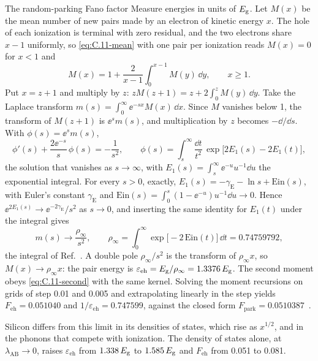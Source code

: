 \begin{workedexample}{The random-parking Fano factor}\label{we:18-parking}
Measure energies in units of $E_{\mathrm{g}}$. Let $M(x)$ be the mean number of new pairs made by an electron of kinetic energy $x$. The hole of each ionization is terminal with zero residual, and the two electrons share $x - 1$ uniformly, so \cref{eq:C.11-mean} with one pair per ionization reads $M(x) = 0$ for $x < 1$ and
\begin{equation*}
  M(x) = 1 + \frac{2}{x - 1}\int_0^{x - 1}M(y)\,\dd y , \qquad x \ge 1 .
\end{equation*}
Put $x = z + 1$ and multiply by $z$: $zM(z + 1) = z + 2\int_0^zM(y)\,\dd y$. Take the Laplace transform $m(s) = \int_0^\infty\ee^{-sx}M(x)\,\dd x$. Since $M$ vanishes below 1, the transform of $M(z + 1)$ is $\ee^sm(s)$, and multiplication by $z$ becomes $-\dd/\dd s$. With $\phi(s) = \ee^sm(s)$,
\begin{equation*}
  \phi'(s) + \frac{2\ee^{-s}}{s}\,\phi(s) = -\frac{1}{s^2} , \qquad
  \phi(s) = \int_s^\infty\frac{\dd t}{t^2}\,\exp\bigl[2E_1(s) - 2E_1(t)\bigr] ,
\end{equation*}
the solution that vanishes as $s \to \infty$, with $E_1(s) = \int_s^\infty\ee^{-u}u^{-1}\dd u$ the exponential integral. For every $s > 0$, exactly, $E_1(s) = -\gamma_{\mathrm{E}} - \ln s + \mathrm{Ein}(s)$, with Euler's constant $\gamma_{\mathrm{E}}$ and $\mathrm{Ein}(s) = \int_0^s(1 - \ee^{-u})u^{-1}\dd u \to 0$. Hence $\ee^{2E_1(s)} \to \ee^{-2\gamma_{\mathrm{E}}}/s^2$ as $s \to 0$, and inserting the same identity for $E_1(t)$ under the integral gives
\begin{equation*}
  m(s) \to \frac{\rho_\infty}{s^2} , \qquad
  \rho_\infty = \int_0^\infty\exp\bigl[-2\,\mathrm{Ein}(t)\bigr]\,\dd t = 0.74759792 ,
\end{equation*}
the integral of Ref.~\cite[Eq.~(23)]{subashiev2010correlation}.
A double pole $\rho_\infty/s^2$ is the transform of $\rho_\infty x$, so $M(x) \to \rho_\infty x$: the pair energy is $\varepsilon_{\mathrm{eh}} = E_{\mathrm{g}}/\rho_\infty = 1.3376\,E_{\mathrm{g}}$. The second moment obeys \cref{eq:C.11-second} with the same kernel. Solving the moment recursions on grids of step 0.01 and 0.005 and extrapolating linearly in the step yields $F_{\mathrm{eh}} = 0.051040$ and $1/\varepsilon_{\mathrm{eh}} = 0.747599$, against the closed form $F_{\mathrm{park}} = 0.0510387$~\cite[Eq.~(44)]{subashiev2010correlation}.
\end{workedexample}

Silicon differs from this limit in its densities of states, which rise as $x^{1/2}$, and in the phonons that compete with ionization. The density of states alone, at $\lambda_{\mathrm{AB}} \to 0$, raises $\varepsilon_{\mathrm{eh}}$ from $1.338\,E_{\mathrm{g}}$ to $1.585\,E_{\mathrm{g}}$ and $F_{\mathrm{eh}}$ from 0.051 to 0.081.

